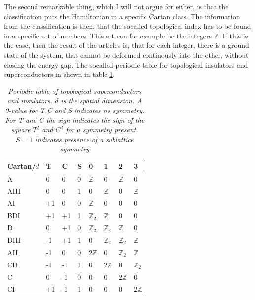 The second remarkable thing, which I will not argue for either, is that the classification puts the Hamiltonian in a specific Cartan class. The information from the classification is then, that the socalled topological index has to be found in a specific set of numbers. This set can for example be the integers $\mathbb{Z}$. If this is the case, then the result of the articles is, that for each integer, there is a ground state of the system, that cannot be deformed continously into the other, without closing the energy gap. The socalled periodic table for topological insulators and superconductors in shown in table \ref{tab.PeriodicTableTISC}.

\begin{table}[htb]
\centering
\caption{\textit{Periodic table of topological superconductors and insulators. $d$ is the spatial dimension. A 0-value for T,C and S indicates no symmetry. For T and C the sign indicates the sign of the square $T^2$ and $C^2$ for a symmetry present. $S=1$ indicates presence of a sublattice symmetry}}
\begin{tabular}{|l|l l l|l l l l|}
\hline Cartan/$d$   &  T &  C & S					& 0 & 1 & 2 & 3 \\
\hline A    		&  0 &  0 & 0					& $\mathbb{Z}$ & 0 & $\mathbb{Z}$ & 0   			 \\
\hline AIII 		&  0 &  0 & 1					& 0 & $\mathbb{Z}$ & 0 & $\mathbb{Z}$   			 \\
\hline AI   		& +1 &  0 & 0					& $\mathbb{Z}$ & 0 & 0 & 0 			    			 \\
\hline BDI	       	& +1 & +1 & 1 					& $\mathbb{Z}_2$ & $\mathbb{Z}$ & 0 & 0 			 \\
\hline D	       	&  0 & +1 & 0 					& $\mathbb{Z}_2$ & $\mathbb{Z}_2$ & $\mathbb{Z}$ & 0 \\
\hline DIII	       	& -1 & +1 & 1 					& 0 & $\mathbb{Z}_2$ & $\mathbb{Z}_2$ & $\mathbb{Z}$ \\
\hline AII	       	& -1 &  0 & 0 				 	& $2\mathbb{Z}$ & 0 & $\mathbb{Z}_2$ & $\mathbb{Z}$  \\
\hline CII	       	& -1 & -1 & 1 					& 0 & $2\mathbb{Z}$ & 0 & $\mathbb{Z}_2$  			 \\
\hline C	       	&  0 & -1 & 0 					& 0 & 0 & $2\mathbb{Z}$ & 0  						 \\
\hline CI	       	& +1 & -1 & 1 					& 0 & 0 & 0 & $2\mathbb{Z}$  						 \\
\hline 
\end{tabular}
\label{tab.PeriodicTableTISC}
\end{table}

